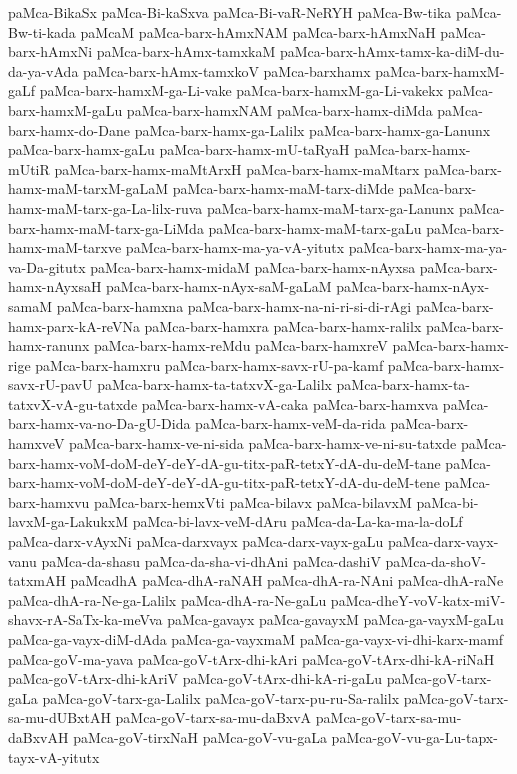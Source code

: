{paMca-BikaSx
paMca-Bi-kaSxva
paMca-Bi-vaR-NeRYH
paMca-Bw-tika
paMca-Bw-ti-kada
paMcaM
paMca-barx-hAmxNAM
paMca-barx-hAmxNaH
paMca-barx-hAmxNi
paMca-barx-hAmx-tamxkaM
paMca-barx-hAmx-tamx-ka-diM-du-da-ya-vAda
paMca-barx-hAmx-tamxkoV
paMca-barxhamx
paMca-barx-hamxM-gaLf
paMca-barx-hamxM-ga-Li-vake
paMca-barx-hamxM-ga-Li-vakekx
paMca-barx-hamxM-gaLu
paMca-barx-hamxNAM
paMca-barx-hamx-diMda
paMca-barx-hamx-do-Dane
paMca-barx-hamx-ga-Lalilx
paMca-barx-hamx-ga-Lanunx
paMca-barx-hamx-gaLu
paMca-barx-hamx-mU-taRyaH
paMca-barx-hamx-mUtiR
paMca-barx-hamx-maMtArxH
paMca-barx-hamx-maMtarx
paMca-barx-hamx-maM-tarxM-gaLaM
paMca-barx-hamx-maM-tarx-diMde
paMca-barx-hamx-maM-tarx-ga-La-lilx-ruva
paMca-barx-hamx-maM-tarx-ga-Lanunx
paMca-barx-hamx-maM-tarx-ga-LiMda
paMca-barx-hamx-maM-tarx-gaLu
paMca-barx-hamx-maM-tarxve
paMca-barx-hamx-ma-ya-vA-yitutx
paMca-barx-hamx-ma-ya-va-Da-gitutx
paMca-barx-hamx-midaM
paMca-barx-hamx-nAyxsa
paMca-barx-hamx-nAyxsaH
paMca-barx-hamx-nAyx-saM-gaLaM
paMca-barx-hamx-nAyx-samaM
paMca-barx-hamxna
paMca-barx-hamx-na-ni-ri-si-di-rAgi
paMca-barx-hamx-parx-kA-reVNa
paMca-barx-hamxra
paMca-barx-hamx-ralilx
paMca-barx-hamx-ranunx
paMca-barx-hamx-reMdu
paMca-barx-hamxreV
paMca-barx-hamx-rige
paMca-barx-hamxru
paMca-barx-hamx-savx-rU-pa-kamf
paMca-barx-hamx-savx-rU-pavU
paMca-barx-hamx-ta-tatxvX-ga-Lalilx
paMca-barx-hamx-ta-tatxvX-vA-gu-tatxde
paMca-barx-hamx-vA-caka
paMca-barx-hamxva
paMca-barx-hamx-va-no-Da-gU-Dida
paMca-barx-hamx-veM-da-rida
paMca-barx-hamxveV
paMca-barx-hamx-ve-ni-sida
paMca-barx-hamx-ve-ni-su-tatxde
paMca-barx-hamx-voM-doM-deY-deY-dA-gu-titx-paR-tetxY-dA-du-deM-tane
paMca-barx-hamx-voM-doM-deY-deY-dA-gu-titx-paR-tetxY-dA-du-deM-tene
paMca-barx-hamxvu
paMca-barx-hemxVti
paMca-bilavx
paMca-bilavxM
paMca-bi-lavxM-ga-LakukxM
paMca-bi-lavx-veM-dAru
paMca-da-La-ka-ma-la-doLf
paMca-darx-vAyxNi
paMca-darxvayx
paMca-darx-vayx-gaLu
paMca-darx-vayx-vanu
paMca-da-shasu
paMca-da-sha-vi-dhAni
paMca-dashiV
paMca-da-shoV-tatxmAH
paMcadhA
paMca-dhA-raNAH
paMca-dhA-ra-NAni
paMca-dhA-raNe
paMca-dhA-ra-Ne-ga-Lalilx
paMca-dhA-ra-Ne-gaLu
paMca-dheY-voV-katx-miV-shavx-rA-SaTx-ka-meVva
paMca-gavayx
paMca-gavayxM
paMca-ga-vayxM-gaLu
paMca-ga-vayx-diM-dAda
paMca-ga-vayxmaM
paMca-ga-vayx-vi-dhi-karx-mamf
paMca-goV-ma-yava
paMca-goV-tArx-dhi-kAri
paMca-goV-tArx-dhi-kA-riNaH
paMca-goV-tArx-dhi-kAriV
paMca-goV-tArx-dhi-kA-ri-gaLu
paMca-goV-tarx-gaLa
paMca-goV-tarx-ga-Lalilx
paMca-goV-tarx-pu-ru-Sa-ralilx
paMca-goV-tarx-sa-mu-dUBxtAH
paMca-goV-tarx-sa-mu-daBxvA
paMca-goV-tarx-sa-mu-daBxvAH
paMca-goV-tirxNaH
paMca-goV-vu-gaLa
paMca-goV-vu-ga-Lu-tapx-tayx-vA-yitutx
}
